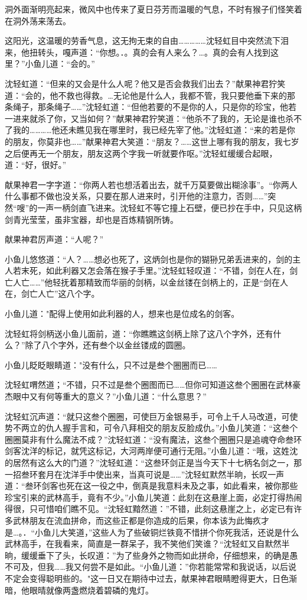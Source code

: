 \documentclass[12pt,oneside]{book}
\begin{document}
洞外面渐明亮起来，微风中也传来了夏日芬芳而温暖的气息，不时有猴子们怪笑着在洞外荡来荡去。

这阳光，这温暖的劳香气息，这无拘无束的自由\ldots\ldots\ldots\ldots\ldots 沈轻虹目中突然流下泪来，他扭转头，嘎声道：``你想。．。真的会有人来么？\ldots。真的会有人找到这里？''小鱼儿道：``会的。''

沈轻虹道：``但来的又会是什么人呢？他又是否会救我们出去？''献果神君狞笑道：``会的，他不救也得救。\ldots 无论他是什么人，我都不管，我只要他垂下来的那条绳子，那条绳子\ldots\ldots{}''沈轻虹道：``但他若要的不是你的人，只是你的珍宝，他若一进来就杀了你，又当如何？''献果神君狞笑道：``他杀不了我的，无论是谁也杀不了我的\ldots\ldots\ldots\ldots 他还未瞧见我在哪里时，我已经先宰了他。''沈轻虹道：``来的若是你的朋友，你莫非也\ldots\ldots{}''献果神君大笑道：``朋友？\ldots\ldots 这世上哪有我的朋友，我七岁之后便再无一个朋友，朋友这两个字我一听就要作呕。''沈轻虹缓缓合起眼，道：``好，很好。''

献果神君一字字道：``你两人若也想活着出去，就千万莫要做出糊涂事''。``你两人什么事都不做也没关系，只要在那人进来时，引开他的注意力，否则\ldots\ldots{}''突然``嗖''的一声一柄剑直飞进来。沈轻虹不等它撞上石壁，便已抄在手中，只见这柄剑青光莹莹，虽非宝器，却也是百炼精钢所铸。

献果神君厉声道：``人呢？''

小鱼儿悠悠道：``人？\ldots\ldots 想必也死了，这炳剑也是你的猢狲兄弟丢进来的，剑的主人若末死，如此利器又怎会落在猴子手里。''沈轻虹轻叹道：``不错，剑在人在，剑亡人亡\ldots\ldots{}''他轻抚着那精致而华丽的剑柄，以金丝镂在剑柄上的，正是``剑在人在，剑亡人亡''这八个字。

小鱼儿道："配得上使用如此利器的人，想来也是位成名的剑客。

沈轻虹将剑柄送小鱼儿面前，道：``你瞧瞧这剑柄上除了这八个字外，还有什么？''除了八个字外，还有叁个以金丝镂成的圆圈。

小鱼儿眨眨眼睛道："没有什么，只不过是叁个圈圈而已\ldots\ldots{}

沈轻虹喟然道；``不错，只不过是叁个圈图而已\ldots\ldots 但你可知道这叁个圈圈在武林豪杰眼中又有何等重大的意义？''小鱼儿道：``什么意思？''

沈轻虹沉声道：``就只这叁个圈圈，可使巨万金银易手，可令上千人马改道，可使势不两立的仇人握手言和，可令八拜相交的朋友反脸成仇。''小鱼儿笑道：``这叁个圈圈莫非有什么魔法不成？''沈轻虹道：``没有魔法，这叁个圈圈只是追魂夺命叁环剑客沈洋的标记，就凭这标记，大河两岸便可通行无阻。''小鱼儿道：``哦，这姓沈的居然有这么大的门道？''沈轻虹道：``这叁环剑正是当今天下十七柄名剑之一，那一招叁环套月在沈洋手中使出来，当真可说是\ldots\ldots{}''沈轻虹默然半晌，长叹一声道：``叁环剑客也死在这一役之中，倒真是我意料未及之事，如此看来，被你那些珍宝引来的武林高手，竟有不少。''小鱼儿笑道：此刻在这悬崖上面，必定打得热闹得很，只可惜咱们瞧不见。``沈轻虹黯然道：''不错，此刻这悬崖之上，必定已有许多武林朋友在流血拼命，而这些正都是你造成的后果，你本该为此悔疚才是\ldots。．``小鱼儿大笑道，''这些人为了些破铜烂铁竟不惜拼个你死我活，还说是什么武林高手，在我看来，简直是一群呆子，我不笑他们笑谁？``沈轻虹又自默然半晌，缓缓垂下了头，长叹道：''为了些身外之物而如此拼命，仔细想来，的确是愚不可及，但我\ldots\ldots 我又何尝不是如此。``小鱼儿道：''你若能常常和我说话，以后说不定会变得聪明些的。"这一日又在期待中过去，献果神君眼睛瞪得更大，日色渐暗，他眼晴就像两盏燃烧着碧磷的鬼灯。
\end{document}
